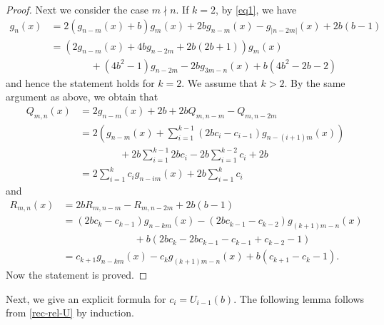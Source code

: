 \documentclass[a4paper, 11pt]{amsart}
\numberwithin{equation}{section}
\theoremstyle{definition}
\begin{document}
\begin{proof}
Next we consider the case $m\nmid n$.
If $k=2$, by \eqref{eq1}, we have
\begin{align*}
g_n(x)
&=2(g_{n-m}(x)+b)g_m(x)+2bg_{n-m}(x)-g_{|n-2m|}(x)+2b(b-1)\\
&=(2g_{n-m}(x)+4bg_{n-2m}+2b(2b+1))g_m(x)\\
&\qquad \qquad +(4b^2-1)g_{n-2m}-2bg_{3m-n}(x)+b(4b^2-2b-2)
\end{align*}
and hence the statement holds for $k=2$.
We assume that $k>2$. By the same argument as above, we obtain that
\begin{align*}
Q_{m,n}(x)
&=2g_{n-m}(x)+2b+2bQ_{m,n-m}-Q_{m,n-2m}\\
&=2\left( g_{n-m}(x)+\sum_{i=1}^{k-1}(2bc_i-c_{i-1})g_{n-(i+1)m}(x)\right)\\&\qquad \qquad +2b\sum_{i=1}^{k-1}2bc_{i}-2b\sum_{i=1}^{k-2}c_{i}+2b\\
&=2\sum_{i=1}^kc_ig_{n-im}(x)+2b\sum_{i=1}^{k}c_{i}
\end{align*}
and
\begin{align*}
R_{m,n}(x)
&=2bR_{m,n-m}-R_{m,n-2m}+2b(b-1)\\
&=(2bc_k-c_{k-1})g_{n-km}(x)-(2bc_{k-1}-c_{k-2})g_{(k+1)m-n}(x)\\
&\hspace{3cm}+b(2bc_{k}-2bc_{k-1}-c_{k-1}+c_{k-2}-1)\\
&=c_{k+1}g_{n-km}(x)-c_kg_{(k+1)m-n}(x)+b(c_{k+1}-c_k-1).
\end{align*}
Now the statement is proved.
\end{proof}

Next, we give an explicit formula for $c_i=U_{i-1}(b)$.
The following lemma follows from \eqref{rec-rel-U} by induction.
\end{document}
